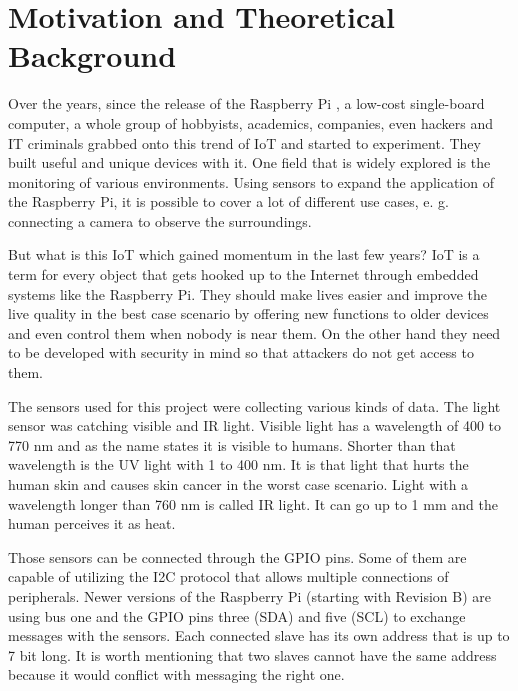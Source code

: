 \documentclass[bachelorthesis, grey, english]{mas-thesis-chapters} %
\begin{document}
\begingroup %
	\let\clearpage\relax
	\printglossaries
\endgroup


\cleardoublepage
{}
\setcounter{page}{1}


\section{Motivation and Theoretical Background}

Over the years, since the release of the Raspberry Pi \cite{raspberry}, a low-cost single-board computer, a whole group of hobbyists, academics, companies, even hackers and \acrshort{IT} criminals grabbed onto this trend of \gls{IoT} and started to experiment. They built useful and unique devices with it. One field that is widely explored is the monitoring of various environments. Using sensors to expand the application of the Raspberry Pi, it is possible to cover a lot of different use cases, e. g. connecting a camera to observe the surroundings. 

But what is this \gls{IoT} which gained momentum in the last few years? \gls{IoT} is a term for every object that gets hooked up to the Internet through embedded systems like the Raspberry Pi. They should make lives easier and improve the live quality in the best case scenario by offering new functions to older devices and even control them when nobody is near them. On the other hand they need to be developed with security in mind so that attackers do not get access to them. \cite{iot}

The sensors used for this project were collecting various kinds of data. The light sensor was catching visible and \gls{IR} light. Visible light has a wavelength of 400 to 770 \gls{nm} and as the name states it is visible to humans. Shorter than that wavelength is the \gls{UV} light with 1 to 400 \gls{nm}. It is that light that hurts the human skin and causes skin cancer in the worst case scenario. Light with a wavelength longer than 760 \gls{nm} is called \gls{IR} light. It can go up to 1 \gls{mm} and the human perceives it as heat. \cite{lightDesc}

Those sensors can be connected through the \gls{GPIO} pins. Some of them are capable of utilizing the \gls{I2C} protocol that allows multiple connections of peripherals. Newer versions of the Raspberry Pi (starting with Revision B) are using bus one and the \gls{GPIO} pins three (\gls{SDA}) and five (\gls{SCL}) to exchange messages with the sensors. Each connected slave has its own address that is up to 7 bit long. It is worth mentioning that two slaves cannot have the same address because it would conflict with messaging the right one. \cite[p.~167ff]{masteringPi}
\end{document}
